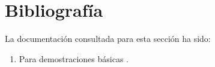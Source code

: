 
\section{Bibliografía} 

La documentación consultada para esta sección ha sido: 

\begin{enumerate}
    \item Para demostraciones básicas \cite{the-elements-of-real-analysis}. 
\end{enumerate}